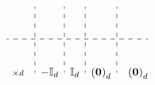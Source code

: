 \documentclass{article}
\begin{document}
\[\begin{array}{rl@{}:cccc:cccc:c:@{}r r@{}c@{}l}
                                                  &                                                                                            & \multicolumn{4}{c:}{}                                         & \multicolumn{4}{c:}{}                                      & \multicolumn{1}{c:}{                              } &                                                                                            &                                                                                            & \\
                                                  &                                                                                            & \multicolumn{4}{c:}{}                                         & \multicolumn{4}{c:}{}                                      & \multicolumn{1}{c:}{                              } &                                                                                            &                                                                                            &                                                                                               \\
                                                  &                                                                                            & \multicolumn{4}{c:}{}                                         & \multicolumn{4}{c:}{}                                      & \multicolumn{1}{c:}{                              } &                                                                                            &                                                                                            & \\
        \hdashline      \rule{0pt}{1.5em}
        \multirow{4}{*}{$\scriptstyle{\times d}$} &                                                                                            & \multicolumn{4}{c:}{\multirow{4}{*}{$-\mathbb I_d$}}          & \multicolumn{4}{c:}{\multirow{4}{*}{$\mathbb I_d$}}        & \multicolumn{1}{c:}{\multirow{4}{*}{$\mathbf {(0)}_d$}} &                                                                                            &                                                                                            & \multirow{4}{*}{$\mathbf {(0)}_d$}                                                                                                   \\
                                                  &                                                                                            & \multicolumn{4}{c:}{}                                         & \multicolumn{4}{c:}{}                                      & \multicolumn{1}{c:}{                              } &                                                                                            &                                                                                            & \\

\end{array}\]
\end{document}
